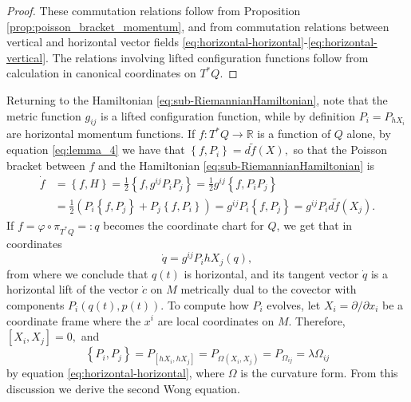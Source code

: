 \documentclass[12pt, letterpaper, reqno]{amsart}
\theoremstyle{definition}
\theoremstyle{plain}
\theoremstyle{remark}
\begin{document}
\begin{proof}
	These commutation relations follow from Proposition \ref{prop:poisson_bracket_momentum}, and from commutation relations between vertical and horizontal vector fields \eqref{eq:horizontal-horizontal}-\eqref{eq:horizontal-vertical}. The relations involving lifted configuration functions follow from calculation in canonical coordinates on $ T^*Q. $ 
\end{proof}
Returning to the Hamiltonian \eqref{eq:sub-RiemannianHamiltonian}, note that the metric function $ g_{ij} $ is a lifted configuration function, while by definition $ P_i=P_{hX_i} $ are horizontal momentum functions. If $ f: T^*Q \rightarrow \mathbb{R} $ is a function of $ Q $ alone, by equation \eqref{eq:lemma_4} we have that $ \left\{ f, P_i \right\} = d\tilde f(X), $ so that the Poisson bracket between $ f $ and the Hamiltonian \eqref{eq:sub-RiemannianHamiltonian} is 
\begin{align*}
	\dot{f} &= \left\{ f, H \right\} = \frac{1}{2} \left\{ f, g^{ij}P_iP_j \right\} = \frac{1}{2} g^{ij} \left\{ f, P_iP_j \right\} \\&= \frac{1}{2} \left( P_i \left\{ f,P_j \right\} +P_j \left\{ f,P_i \right\}  \right) = g^{ij}P_i \left\{ f,P_j \right\} = g^{ij} P_i d\tilde f( X_j). 
\end{align*}
If $ f= \varphi\circ\pi_{T^*Q}=:q $ becomes the coordinate chart for $ Q $, we get that in coordinates 
$$ \dot{q} = g^{ij}P_i hX_j(q), $$ 
from where we conclude that $ q(t) $ is horizontal, and its tangent vector $ \dot{q} $ is a horizontal lift of the vector $ \dot{c} $ on $ M $ metrically dual to the covector with components $ P_i(q(t), p(t)). $ To compute how $ P_i $ evolves, let $ X_i=\partial/\partial x_i $ be a coordinate frame where the $ x^i $ are local coordinates on $ M. $  Therefore, $ [X_i,X_j]=0, $ and
$$ \left\{ P_i,P_j \right\} = P_{[hX_i, hX_j]}= P_{\Omega(X_i, X_j)} = P_{\Omega_{ij}} = \lambda \Omega_{ij} $$ 
by equation \eqref{eq:horizontal-horizontal}, where $ \Omega $ is the curvature form. From this discussion we derive the second Wong equation.
\end{document}
